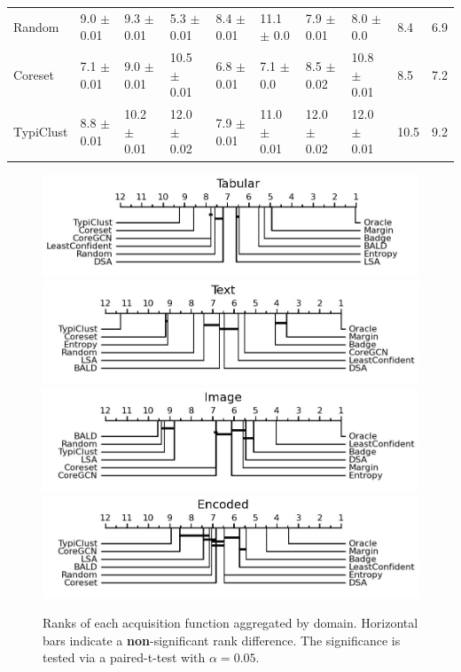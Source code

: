 \documentclass[]{article}
\begin{document}
\begin{table}[]
{\begin{tabular}{l|lllllll|ll}
Random   & 9.0 $\pm$ {\small 0.01} & 9.3 $\pm$ {\small 0.01} & 5.3 $\pm$ {\small 0.01} & 8.4 $\pm$ {\small 0.01} & 11.1 $\pm$ {\small 0.0}  & 7.9 $\pm$ {\small 0.01} & 8.0 $\pm$ {\small 0.0} & 8.4 & 6.9 \\
Coreset  & 7.1 $\pm$ {\small 0.01} & 9.0 $\pm$ {\small 0.01} & 10.5 $\pm$ {\small 0.01} & 6.8 $\pm$ {\small 0.01} & 7.1 $\pm$ {\small 0.0}  & 8.5 $\pm$ {\small 0.02} & 10.8 $\pm$ {\small 0.01} & 8.5 & 7.2 \\
TypiClust & 8.8 $\pm$ {\small 0.01} & 10.2 $\pm$ {\small 0.01} & 12.0 $\pm$ {\small 0.02} & 7.9 $\pm$ {\small 0.01} & 11.0 $\pm$ {\small 0.01} & 12.0 $\pm$ {\small 0.02} & 12.0 $\pm$ {\small 0.01} & 10.5 & 9.2 \\
\end{tabular}
       	}
\end{table}
%
\begin{figure}
    \centering
    \caption{Ranks of each acquisition function aggregated by domain. Horizontal bars indicate a \textbf{non}-significant rank difference. The significance is tested via a paired-t-test with $\alpha=0.05$.}
    \label{fig:ranks_by_domain}
    \includegraphics[width=0.49\linewidth]{img/macro_vector.jpg}
    \includegraphics[width=0.49\linewidth]{img/macro_text.jpg}
    \includegraphics[width=0.49\linewidth]{img/macro_img.jpg}
    \includegraphics[width=0.49\linewidth]{img/macro_enc.jpg}
    \vspace{-7mm}
\end{figure}
%
\end{document}
